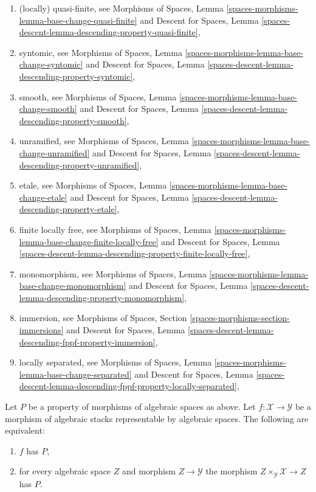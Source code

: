 \begin{enumerate}
\item (locally) quasi-finite, see
Morphisms of Spaces,
Lemma \ref{spaces-morphisms-lemma-base-change-quasi-finite}
and
Descent for Spaces,
Lemma \ref{spaces-descent-lemma-descending-property-quasi-finite},
\item syntomic, see
Morphisms of Spaces,
Lemma \ref{spaces-morphisms-lemma-base-change-syntomic}
and
Descent for Spaces,
Lemma \ref{spaces-descent-lemma-descending-property-syntomic},
\item smooth, see
Morphisms of Spaces,
Lemma \ref{spaces-morphisms-lemma-base-change-smooth}
and
Descent for Spaces,
Lemma \ref{spaces-descent-lemma-descending-property-smooth},
\item unramified, see
Morphisms of Spaces,
Lemma \ref{spaces-morphisms-lemma-base-change-unramified}
and
Descent for Spaces,
Lemma \ref{spaces-descent-lemma-descending-property-unramified},
\item etale, see
Morphisms of Spaces,
Lemma \ref{spaces-morphisms-lemma-base-change-etale}
and
Descent for Spaces,
Lemma \ref{spaces-descent-lemma-descending-property-etale},
\item finite locally free, see
Morphisms of Spaces,
Lemma \ref{spaces-morphisms-lemma-base-change-finite-locally-free}
and
Descent for Spaces,
Lemma \ref{spaces-descent-lemma-descending-property-finite-locally-free},
\item monomorphism, see
Morphisms of Spaces,
Lemma \ref{spaces-morphisms-lemma-base-change-monomorphism}
and
Descent for Spaces,
Lemma \ref{spaces-descent-lemma-descending-property-monomorphism},
\item immersion, see
Morphisms of Spaces, Section \ref{spaces-morphisms-section-immersions}
and
Descent for Spaces,
Lemma \ref{spaces-descent-lemma-descending-fppf-property-immersion},
\item locally separated, see
Morphisms of Spaces,
Lemma \ref{spaces-morphisms-lemma-base-change-separated}
and
Descent for Spaces,
Lemma \ref{spaces-descent-lemma-descending-fppf-property-locally-separated},
\end{enumerate}

\begin{lemma}
\label{lemma-property-spaces-too}
Let $P$ be a property of morphisms of algebraic spaces as above.
Let $f : \mathcal{X} \to \mathcal{Y}$ be a morphism of algebraic stacks
representable by algebraic spaces. The following are equivalent:
\begin{enumerate}
\item $f$ has $P$,
\item for every algebraic space $Z$ and morphism $Z \to \mathcal{Y}$
the morphism $Z \times_{\mathcal{Y}} \mathcal{X} \to Z$ has $P$.
\end{enumerate}
\end{lemma}

